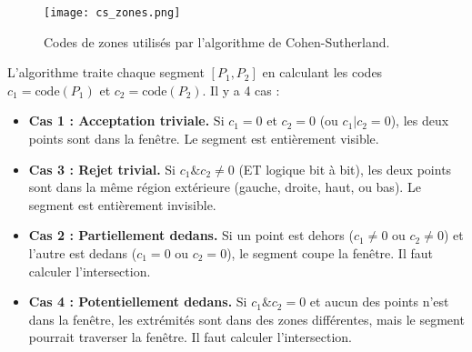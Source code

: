 \documentclass{article}
\begin{document}
\begin{figure}[H]
\centering
\texttt{[image: cs\_zones.png]}
\caption{Codes de zones utilisés par l'algorithme de Cohen-Sutherland.}
\label{fig:cs_zones}
\end{figure}

L'algorithme traite chaque segment $[P_1, P_2]$ en calculant les codes $c_1 = \text{code}(P_1)$ et $c_2 = \text{code}(P_2)$. Il y a 4 cas :

\begin{itemize}
    \item \textbf{Cas 1 : Acceptation triviale.} Si $c_1 = 0$ et $c_2 = 0$ (ou $c_1 | c_2 = 0$), les deux points sont dans la fenêtre. Le segment est entièrement visible.
    \item \textbf{Cas 3 : Rejet trivial.} Si $c_1 \& c_2 \neq 0$ (ET logique bit à bit), les deux points sont dans la même région extérieure (gauche, droite, haut, ou bas). Le segment est entièrement invisible.
    \item \textbf{Cas 2 : Partiellement dedans.} Si un point est dehors ($c_1 \neq 0$ ou $c_2 \neq 0$) et l'autre est dedans ($c_1=0$ ou $c_2=0$), le segment coupe la fenêtre. Il faut calculer l'intersection.
    \item \textbf{Cas 4 : Potentiellement dedans.} Si $c_1 \& c_2 = 0$ et aucun des points n'est dans la fenêtre, les extrémités sont dans des zones différentes, mais le segment pourrait traverser la fenêtre. Il faut calculer l'intersection.
\end{itemize}
\end{document}
